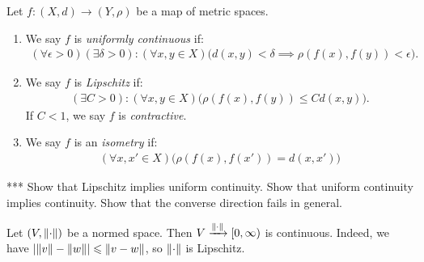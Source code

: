     \begin{definition}
        Let $f:(X,d) \rightarrow (Y,\rho)$ be a map of metric spaces.
        \begin{enumerate}[label = (\arabic*),itemsep=1pt,topsep=3pt]
            \item We say $f$ is \textit{uniformly continuous} if:
                \begin{equation*}
                \begin{split}
                    (\forall \epsilon > 0)(\exists \delta > 0): (\forall x,y \in X)\bigl(d(x,y) < \delta \implies \rho(f(x),f(y)) < \epsilon\bigr).
                \end{split}
                \end{equation*}
            \item We say $f$ is \textit{Lipschitz} if:
                \begin{equation*}
                \begin{split}
                    (\exists C > 0):(\forall x,y \in X)\bigl(\rho(f(x),f(y)) \leq C d(x,y)\bigr).
                \end{split}
                \end{equation*}
            If $C < 1$, we say $f$ is \textit{contractive}.

            \item We say $f$ is an \textit{isometry} if:
                \begin{equation*}
                \begin{split}
                    (\forall x,x' \in X)\bigl(\rho(f(x),f(x')) = d(x,x')\bigr)
                \end{split}
                \end{equation*}
        \end{enumerate}
    \end{definition}

    \begin{exercise}***
        Show that Lipschitz implies uniform continuity. Show that uniform continuity implies continuity. Show that the converse direction fails in general.
    \end{exercise}

    \begin{example}
        Let $(V, \left\lVert \cdot \right\rVert)$ be a normed space. Then $V \xrightarrow{\left\lVert \cdot \right\rVert} [0,\infty)$ is continuous. Indeed, we have $\left| \left\lVert v \right\rVert - \left\lVert w \right\rVert \right| \leqslant \left\lVert v - w \right\rVert$, so $\left\lVert \cdot \right\rVert$ is Lipschitz.
    \end{example}

